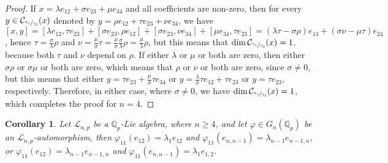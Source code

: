\documentclass[12pt]{article}
\newtheorem{corollary}[theorem]{Corollary}
\begin{document}
\begin{proof}
If $x=\lambda e_{12}+\sigma e_{23}+\mu e_{34}$ and all coefficients are non-zero, then for every $y\in\mathcal{C}_{\sfrac{\gamma_1}{\gamma_2}}(x)$ denoted by $y=\rho e_{12}+\tau e_{23}+\nu e_{34}$, we have $[x,y]=[\lambda e_{12},\tau e_{23}]+[\sigma e_{23},\rho e_{12}]+[\sigma e_{23},\nu e_{34}]+[\mu e_{34},\tau e_{23}]=(\lambda\tau-\sigma\rho)e_{13}+(\sigma\nu-\mu\tau)e_{24}$, hence $\tau=\frac{\sigma}{\lambda}\rho$ and $\nu=\frac{\mu}{\sigma}\tau=\frac{\mu}{\sigma}\frac{\sigma}{\lambda}\rho=\frac{\mu}{\lambda}\rho$, but this means that $\dim\mathcal{C}_{\sfrac{\gamma_1}{\gamma_2}}(x)=1$, because both $\tau$ and $\nu$ depend on $\rho$. If either $\lambda$ or $\mu$ or both are zero, then either $\sigma\rho$ or $\sigma\mu$ or both are zero, which means that $\rho$ or $\nu$ or both are zero, since $\sigma\neq 0$, but this means that either $y=\tau e_{23}+\frac{\mu}{\sigma}\tau e_{34}$ or $y=\frac{\lambda}{\sigma}\tau e_{12}+\tau e_{23}$ or $y=\tau e_{23}$, respectively. Therefore, in either case, where $\sigma\neq 0$, we have $\dim\mathcal{C}_{\sfrac{\gamma_1}{\gamma_2}}(x)=1$, which completes the proof for $n=4$.
\end{proof}
\begin{corollary}
Let $\mathcal{L}_{n,p}$ be a $\mathbb{Q}_p$-Lie algebra, where $n\geq 4$, and let $\varphi\in G_n(\mathbb{Q}_p)$ be an $\mathcal{L}_{n,p}$-automorphism, then
$\varphi_{11}(e_{12})=\lambda_1 e_{12}$ and $\varphi_{11}(e_{n,n-1})=\lambda_{n-1}e_{n-1,n}$, or $\varphi_{11}(e_{12})=\lambda_{n-1} e_{n-1,n}$ and $\varphi_{11}(e_{n,n-1})=\lambda_1 e_{1,2}$.
\end{corollary}
\end{document}
